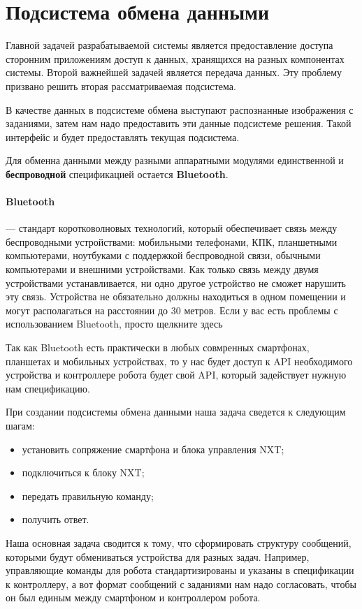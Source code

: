 \section{Подсистема обмена данными}

Главной задачей разрабатываемой системы является предоставление доступа сторонним приложениям доступ к данных, хранящихся на разных компонентах системы. Второй важнейшей задачей является передача данных. Эту проблему призвано решить вторая рассматриваемая подсистема.

В качестве данных в подсистеме обмена выступают распознанные изображения с заданиями, затем нам надо предоставить эти данные подсистеме решения. Такой интерфейс и будет предоставлять текущая подсистема.

Для обменна данными между разными аппаратными модулями единственной и \textbf{беспроводной} спецификацией остается \textbf{Bluetooth}.  

\paragraph{Bluetooth}  —  стандарт коротковолновых технологий, который обеспечивает связь между беспроводными устройствами: мобильными телефонами, КПК, планшетными компьютерами, ноутбуками с поддержкой беспроводной связи, обычными компьютерами и внешними устройствами. Как только связь между двумя устройствами устанавливается, ни одно другое устройство не сможет нарушить эту связь. Устройства не обязательно должны находиться в одном помещении и могут располагаться на расстоянии до 30 метров. Если у вас есть проблемы с использованием Bluetooth, просто щелкните здесь

Так как Bluetooth есть практически в любых совмренных смартфонах, планшетах и мобильных устройствах, то у нас будет доступ к API необходимого устройства и контроллере робота будет свой API, который задействует нужную нам спецификацию.

При создании подсистемы обмена данными наша задача сведется к следующим шагам:
\begin{itemize}
 \item установить сопряжение смартфона и блока управления NXT;
 \item подключиться к блоку NXT;
 \item передать правильную команду;
 \item получить ответ.
\end{itemize}

Наша основная задача сводится к тому, что сформировать структуру сообщений, которыми будут обмениваться устройства для разных задач.
Например, управляющие команды для робота стандартизированы и указаны в спецификации к контроллеру, а вот формат сообщений с заданиями нам надо согласовать, чтобы он был единым между смартфоном и контроллером робота.

